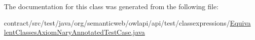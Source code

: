 The documentation for this class was generated from the following file\-:\begin{DoxyCompactItemize}
\item 
contract/src/test/java/org/semanticweb/owlapi/api/test/classexpressions/\hyperlink{_equivalent_classes_axiom_nary_annotated_test_case_8java}{Equivalent\-Classes\-Axiom\-Nary\-Annotated\-Test\-Case.\-java}\end{DoxyCompactItemize}
